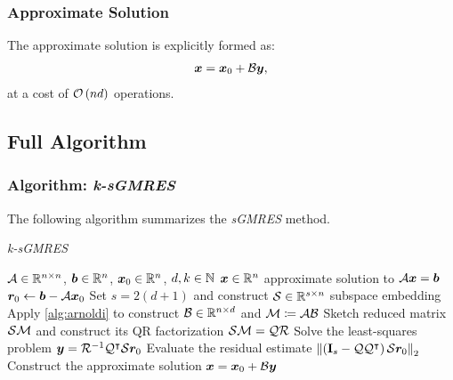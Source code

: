 \begin{frame}
    \frametitle{Approximate Solution}

    The approximate solution is explicitly formed as:
    \begin{align}
        \bm{x} = \bm{x}_0 + \mathcal{B} \bm{y},
    \end{align}
    at a cost of $\mathcal{O} \left( n d \right)$ operations.
\end{frame}

\subsection{Full Algorithm}

\begin{frame}[fragile]
    \frametitle{Algorithm: \textit{k-sGMRES}}

    The following algorithm summarizes the \textit{sGMRES} method.

    \begin{algorithm}[H]
    \caption{\textit{k-sGMRES}} \label{alg:sgmres}
    \begin{algorithmic}
    \Require $\mathcal{A} \in \mathbb{R}^{n \times n}$, $\bm{b} \in \mathbb{R}^{n}$, $\bm{x}_0 \in \mathbb{R}^{n}$, $d, k \in \mathbb{N}$
    \Ensure $\bm{x} \in \mathbb{R}^{n}$ approximate solution to $\mathcal{A} \bm{x} = \bm{b}$
    \State $\bm{r}_0 \gets \bm{b} - \mathcal{A} \bm{x}_0$
    \State Set $s = 2 (d + 1)$ and construct $\mathcal{S} \in \mathbb{R}^{s \times n}$ subspace embedding
    \State Apply \cref{alg:arnoldi} to construct $\mathcal{B} \in \mathbb{R}^{n \times d}$ and $\mathcal{M} \coloneqq \mathcal{A} \mathcal{B}$
    \State Sketch reduced matrix $\mathcal{S} \mathcal{M}$ and construct its QR factorization $\mathcal{S} \mathcal{M} = \mathcal{Q} \mathcal{R}$
    \State Solve the least-squares problem $\bm{y} = \mathcal{R}^{-1} \mathcal{Q}^{\intercal} \mathcal{S} \bm{r}_0$
    \State Evaluate the residual estimate $\left\lVert  \left( \mathbf{I}_s - \mathcal{Q} \mathcal{Q}^{\intercal} \right) \mathcal{S} \bm{r}_0  \right\rVert_2$
    \State Construct the approximate solution $\bm{x} = \bm{x}_0 + \mathcal{B} \bm{y}$
    \end{algorithmic}
    \end{algorithm}

\end{frame}